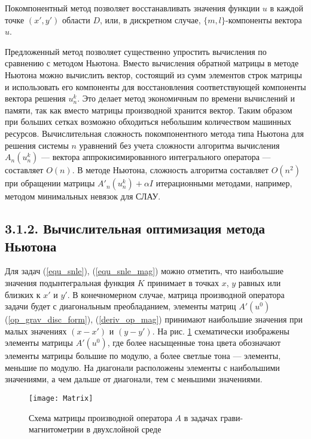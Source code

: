Покомпонентный метод позволяет восстанавливать значения функции $u$ в каждой точке $(x',y')$ области $D$, или, в дискретном случае, $\{m,l\}$-компоненты вектора $u$.

Предложенный метод позволяет существенно упростить вычисления по сравнению с методом Ньютона. Вместо вычисления обратной матрицы в методе Ньютона можно вычислить вектор, состоящий из сумм элементов строк матрицы и использовать его компоненты для восстановления соответствующей компоненты вектора решения $u_n^k$. Это делает метод экономичным по времени вычислений и памяти, так как вместо матрицы производной хранится вектор. Таким образом при больших сетках возможно обходиться небольшим количеством машинных ресурсов. Вычислительная сложность покомпонентного метода типа Ньютона для решения системы $n$ уравнений без учета сложности алгоритма вычисления $A_n(u_n^k)$ --- вектора аппрокисимированного интегрального оператора --- составляет $O(n)$. В методе Ньютона, сложность алгоритма составляет $O(n^2)$ при обращении матрицы $A'_n(u_n^k)+\alpha I$ итерационными методами, например, методом минимальных невязок для СЛАУ.

\smallskip
\subsection*{3.1.2. Вычислительная оптимизация метода Ньютона}

Для задач (\ref{equ_snle}), (\ref{equ_snle_mag}) можно отметить, что наибольшие значения подынтегральная функция $K$ принимает в точках $x$, $y$ равных или близких к $x'$ и $y'$. В конечномерном случае, матрица производной оператора задачи будет с диагональным преобладанием, элементы матриц $A'(u^0)$ (\ref{op_grav_disc_form}), (\ref{deriv_op_mag}) принимают наибольшие значения при малых значениях $(x-x')$ и $(y-y')$. На рис. \ref{fig:matrixscheme} схематически изображены элементы матрицы $A'(u^0)$, где более насыщенные тона цвета обозначают элементы матрицы большие по модулю, а более светлые тона --- элементы, меньшие по модулю. На диагонали расположены элементы с наибольшими значениями, а чем дальше от диагонали, тем с меньшими значениями. 

\begin{figure}[H]
	\centering
	\texttt{[image: Matrix]}
	\caption{Схема матрицы производной оператора $A$ в задачах грави- магнитометрии в двухслойной среде}
	\label{fig:matrixscheme}
\end{figure}

